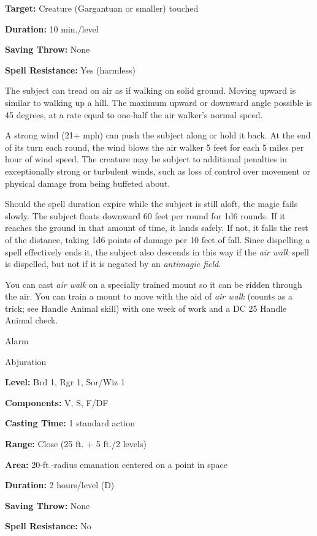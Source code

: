 \documentclass{article}
\begin{document}
\textbf{Target:} Creature (Gargantuan or smaller) touched

\textbf{Duration:} 10 min./level

\textbf{Saving Throw:} None

\textbf{Spell Resistance:} Yes (harmless)

The subject can tread on air as if walking on solid ground. Moving upward is similar 
to walking up a hill. The maximum upward or downward angle possible is 45 degrees, 
at a rate equal to one-half the air walker's normal speed.

A strong wind (21+ mph) can push the subject along or hold it back. At the end 
of its turn each round, the wind blows the air walker 5 feet for each 5 miles per 
hour of wind speed. The creature may be subject to additional penalties in exceptionally 
strong or turbulent winds, such as loss of control over movement or physical damage 
from being buffeted about.

Should the spell duration expire while the subject is still aloft, the magic fails 
slowly. The subject floats downward 60 feet per round for 1d6 rounds. If it reaches 
the ground in that amount of time, it lands safely. If not, it falls the rest of 
the distance, taking 1d6 points of damage per 10 feet of fall. Since dispelling 
a spell effectively ends it, the subject also descends in this way if the \textit{air 
walk }spell is dispelled, but not if it is negated by an \textit{antimagic field}.

You can cast \textit{air walk }on a specially trained mount so it can be ridden 
through the air. You can train a mount to move with the aid of \textit{air walk 
}(counts as a trick; see Handle Animal skill) with one week of work and a DC 25 
Handle Animal check.

\vspace{12pt}
Alarm

Abjuration

\textbf{Level:} Brd 1, Rgr 1, Sor/Wiz 1

\textbf{Components:} V, S, F/DF

\textbf{Casting Time:} 1 standard action

\textbf{Range:} Close (25 ft. + 5 ft./2 levels)

\textbf{Area:} 20-ft.-radius emanation centered on a point in space

\textbf{Duration:} 2 hours/level (D)

\textbf{Saving Throw:} None

\textbf{Spell Resistance:} No
\end{document}
